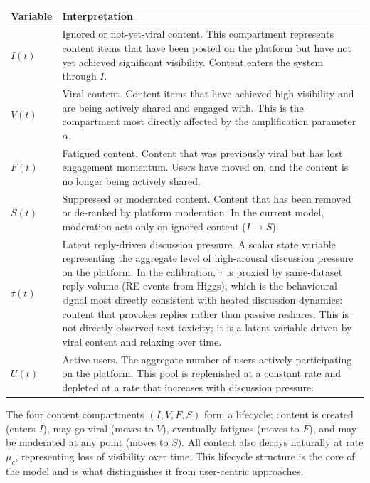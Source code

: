\documentclass[11pt]{article}
\begin{document}
\begin{center}
\begin{tabular}{>{\raggedright\arraybackslash}p{1.6cm} >{\raggedright\arraybackslash}p{11cm}}
\toprule
Variable & Interpretation \\
\midrule
$I(t)$ & Ignored or not-yet-viral content. This compartment represents content items that have been posted on the platform but have not yet achieved significant visibility. Content enters the system through $I$. \\[0.3em]
$V(t)$ & Viral content. Content items that have achieved high visibility and are being actively shared and engaged with. This is the compartment most directly affected by the amplification parameter $\alpha$. \\[0.3em]
$F(t)$ & Fatigued content. Content that was previously viral but has lost engagement momentum. Users have moved on, and the content is no longer being actively shared. \\[0.3em]
$S(t)$ & Suppressed or moderated content. Content that has been removed or de-ranked by platform moderation. In the current model, moderation acts only on ignored content ($I \to S$). \\[0.3em]
$\tau(t)$ & Latent reply-driven discussion pressure. A scalar state variable representing the aggregate level of high-arousal discussion pressure on the platform. In the calibration, $\tau$ is proxied by same-dataset reply volume (RE events from Higgs), which is the behavioural signal most directly consistent with heated discussion dynamics: content that provokes replies rather than passive reshares. This is not directly observed text toxicity; it is a latent variable driven by viral content and relaxing over time. \\[0.3em]
$U(t)$ & Active users. The aggregate number of users actively participating on the platform. This pool is replenished at a constant rate and depleted at a rate that increases with discussion pressure. \\
\bottomrule
\end{tabular}
\end{center}

The four content compartments $(I, V, F, S)$ form a lifecycle: content is created (enters $I$), may go viral (moves to $V$), eventually fatigues (moves to $F$), and may be moderated at any point (moves to $S$). All content also decays naturally at rate $\mu_c$, representing loss of visibility over time. This lifecycle structure is the core of the model and is what distinguishes it from user-centric approaches.
\end{document}
